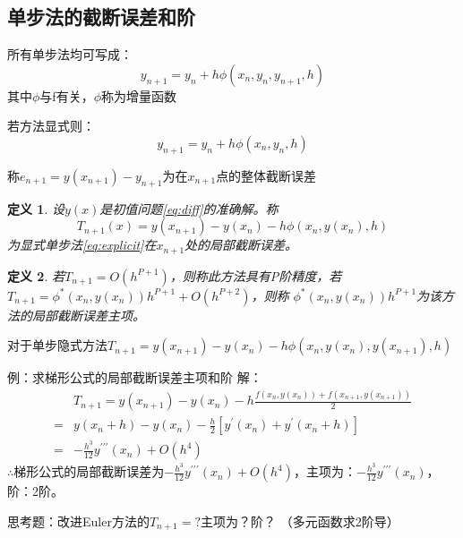 \documentclass{article}
\newtheorem{definition}{定义}[section]
\begin{document}
\subsection{单步法的截断误差和阶}
所有单步法均可写成：
$$y_{n+1} = y_n + h\phi(x_n, y_n, y_{n+1}, h) $$
其中$\phi$与f有关，$\phi$称为增量函数

若方法显式则：
\begin{equation}
    y_{n+1}=y_n+h\phi(x_n, y_n, h) 
    \label{eq:explicit}
\end{equation}

称$e_{n+1} = y(x_{n+1})-y_{n+1} $为在$x_{n+1}$点的整体截断误差

\begin{definition}
    设$y(x)$是初值问题\ref{eq:diff}的准确解。称
    \begin{equation}
        T_{n+1}(x) = y(x_{n+1})-y(x_n)-h\phi(x_n, y(x_n), h) 
    \end{equation}
    为显式单步法\ref{eq:explicit}在$x_{n+1}$处的局部截断误差。
\end{definition}

\begin{definition}
    若$T_{n+1} = O(h^{P+1})$，则称此方法具有P阶精度，若$T_{n+1}=\phi^*(x_n, y(x_n))h^{P+1}+O(h^{P+2})$，则称
    $\phi^*(x_n, y(x_n))h^{P+1}$为该方法的局部截断误差主项。
\end{definition}

对于单步隐式方法$T_{n+1}=y(x_{n+1}) -y(x_n)-h\phi(x_n, y(x_n), y(x_{n+1}), h) $

例：求梯形公式的局部截断误差主项和阶
解：
\begin{equation*}
    \begin{split}
        &T_{n+1} = y(x_{n+1})-y(x_n)-h\frac{f(x_n, y(x_n))+f(x_{n+1},y(x_{n+1}))}{2} \\
        =&y(x_n+h)-y(x_n)-\frac{h}{2}[y^{'}(x_n)+ y^{'}(x_{n}+h)] \\
        =&-\frac{h^3}{12}y^{{'}{'}{'}}(x_n)+O(h^4)
    \end{split}
\end{equation*}
$\therefore$梯形公式的局部截断误差为$-\frac{h^3}{12}y^{{'}{'}{'}}(x_n)+O(h^4)$，主项为：$-\frac{h^3}{12}y^{{'}{'}{'}}(x_n)$，阶：2阶。

思考题：改进Euler方法的$T_{n+1}=?$主项为？阶？
（多元函数求2阶导）
\end{document}
